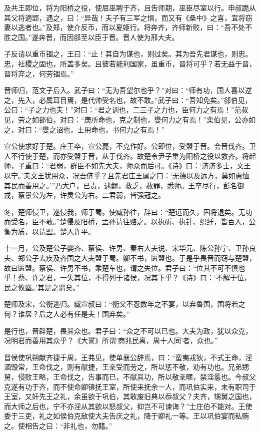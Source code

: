 \documentclass[a4paper,12pt,UTF8,twoside]{ctexbook}
\begin{document}
及共王即位，将为阳桥之役，使屈巫聘于齐，且告师期，巫臣尽室以行。申叔跪从其父将適郢，遇之，曰：“异哉！夫子有三军之惧，而又有《桑中》之喜，宜将窃妻以逃者也。”及郑，使介反币，而以夏姬行。将奔齐，齐师新败，曰：“吾不处不胜之国。”遂奔晋，而因郤至以臣于晋。晋人使为邢大夫。

子反请以重币锢之，王曰：“止！其自为谋也，则过矣。其为吾先君谋也，则忠。忠，社稷之固也，所盖多矣。且彼若能利国家，虽重币，晋将可乎？若无益于晋，晋将弃之，何劳锢焉。”

晋师归，范文子后入。武子曰：“无为吾望尔也乎？”对曰：“师有功，国人喜以逆之，先入，必属耳目焉，是代帅受名也，故不敢。”武子曰：“吾知免矣。”郤伯见，公曰：“子之力也夫！”对曰：“君之训也，二三子之力也，臣何力之有焉！”范叔见，劳之如郤伯，对曰：“庚所命也，克之制也，燮何力之有焉！”栾伯见，公亦如之，对曰：“燮之诏也，士用命也，书何力之有焉！”

宣公使求好于楚。庄王卒，宣公薨，不克作好。公即位，受盟于晋。会晋伐齐。卫人不行使于楚，而亦受盟于晋，从于伐齐。故楚令尹子重为阳桥之役以救齐。将起师，子重曰：“君弱，群臣不如先大夫，师众而后可。《诗》曰：‘济济多士，文王以宁。’夫文王犹用众，况吾侪乎？且先君庄王属之曰：‘无德以及远方，莫如惠恤其民而善用之。’”乃大户，已责，逮鳏，救乏，赦罪，悉师。王卒尽行，彭名御戎，蔡景公为左，许灵公为右。二君弱，皆强冠之。

冬，楚师侵卫，遂侵我，师于蜀。使臧孙往，辞曰：“楚远而久，固将退矣。无功而受名，臣不敢。”楚侵及阳桥，孟孙请往赂之。以执斫、执针、织纴，皆百人，公衡为质，以请盟。楚人许平。

十一月，公及楚公子婴齐、蔡侯、许男、秦右大夫说、宋华元、陈公孙宁、卫孙良夫、郑公子去疾及齐国之大夫盟于蜀。卿不书，匮盟也。于是乎畏晋而窃与楚盟，故曰匮盟。蔡侯、许男不书，乘楚车也，谓之失位。君子曰：“位其不可不慎也乎！蔡、许之君，一失其位，不得列于诸侯，况其下乎？《诗》曰：‘不解于位，民之攸塈。’其是之谓矣。”

楚师及宋，公衡逃归。臧宣叔曰：“衡父不忍数年之不宴，以弃鲁国，国将若之何？谁居？后之人必有任是夫！国弃矣。”

是行也，晋辟楚，畏其众也。君子曰：“众之不可以已也。大夫为政，犹以众克，况明君而善用其众乎？《大誓》所谓‘商兆民离，周十人同’者，众也。”

晋侯使巩朔献齐捷于周，王弗见，使单襄公辞焉，曰：“蛮夷戎狄，不式王命，淫湎毁常，王命伐之，则有献捷，王亲受而劳之，所以惩不敬，劝有功也。兄弟甥舅，侵败王略，王命伐之，告事而已，不献其功，所以敬亲暱，禁淫慝也。今叔父克遂有功于齐，而不使命卿镇抚王室，所使来抚余一人，而巩伯实来，未有职司于王室，又奸先王之礼，余虽欲于巩伯，其敢废旧典以忝叔父？夫齐，甥舅之国也，而大师之后也，宁不亦淫从其欲以怒叔父，抑岂不可谏诲？”士庄伯不能对。王使委于三吏，礼之如侯伯克敌使大夫告庆之礼，降于卿礼一等。王以巩伯宴而私贿之。使相告之曰：“非礼也，勿籍。”
\end{document}
